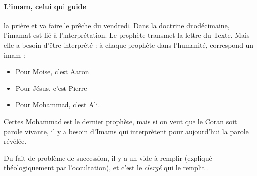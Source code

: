 \paragraph{L'imam, celui qui guide} la prière et va faire le prêche du vendredi.  Dans la doctrine duodécimaine, l'imamat est lié à l'interprétation.
 Le prophète transmet la lettre du Texte. Mais elle a besoin d'être interprété : à chaque prophète dans l'humanité, correspond un imam : 
 \begin{itemize}
     \item Pour Moise, c'est Aaron
     \item Pour Jésus, c'est Pierre
     \item Pour Mohammad, c'est Ali.
 \end{itemize}
 Certes Mohammad est le dernier prophète, mais si on veut que le Coran soit parole vivante, il y a besoin d'Imams qui interprètent pour aujourd'hui la parole révélée.
 
 Du fait de problème de succession, il y a un vide à remplir (expliqué théologiquement par l'occultation), et c'est le \textit{clergé} qui le remplit .
 
 \newpage
